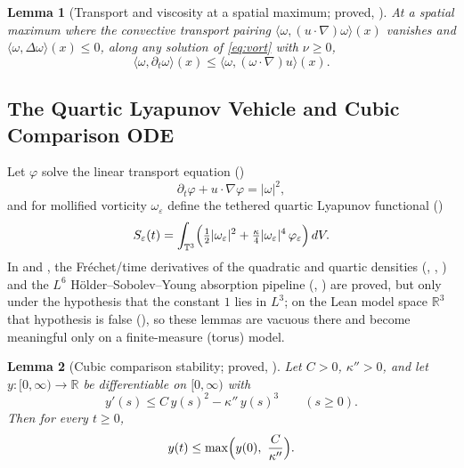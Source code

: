 \documentclass[11pt,a4paper]{article}
\theoremstyle{plain}
\newtheorem{lemma}{Lemma}[section]
\theoremstyle{definition}
\theoremstyle{remark}
\newcommand{\T}{\mathbb{T}^3}
\newcommand{\R}{\mathbb{R}}
\begin{document}
\begin{lemma}[Transport and viscosity at a spatial maximum; proved, ]\label{lem:transport}
At a spatial maximum where the convective transport pairing $\langle\omega,(u\cdot\nabla)\omega\rangle(x)$ vanishes and $\langle\omega,\Delta\omega\rangle(x)\le0$, along any solution of \eqref{eq:vort} with $\nu\ge0$,
\[
\langle\omega,\partial_t\omega\rangle(x)\le\langle\omega,(\omega\cdot\nabla)u\rangle(x).
\]
\end{lemma}

\subsection{The Quartic Lyapunov Vehicle and Cubic Comparison ODE}
Let $\varphi$ solve the linear transport equation ()
\begin{equation}\label{eq:phi}
\partial_t\varphi+u\cdot\nabla\varphi=|\omega|^2,
\end{equation}
and for mollified vorticity $\omega_\varepsilon$ define the tethered quartic Lyapunov functional ()
\begin{equation}\label{eq:S}
S_\varepsilon(t)=\int_{\T}\Bigl(\tfrac12|\omega_\varepsilon|^2+\tfrac{\kappa}{4}|\omega_\varepsilon|^4\,\varphi_\varepsilon\Bigr)\,dV .
\end{equation}
In  and , the Fréchet/time derivatives of the quadratic and quartic densities (, , ) and the $L^6$ Hölder--Sobolev--Young absorption pipeline (, ) are proved, but only under the hypothesis that the constant $1$ lies in $L^3$; on the Lean model space $\mathbb{R}^3$ that hypothesis is false (), so these lemmas are vacuous there and become meaningful only on a finite-measure (torus) model.

\begin{lemma}[Cubic comparison stability; proved, ]\label{lem:cubic}
Let $C>0$, $\kappa''>0$, and let $y:[0,\infty)\to\R$ be differentiable on $[0,\infty)$ with
\[
y'(s)\le C\,y(s)^2-\kappa''\,y(s)^3\qquad(s\ge0).
\]
Then for every $t\ge0$,
\[
y(t)\le\max\Bigl(y(0),\ \frac{C}{\kappa''}\Bigr).
\]
\end{lemma}
\end{document}
